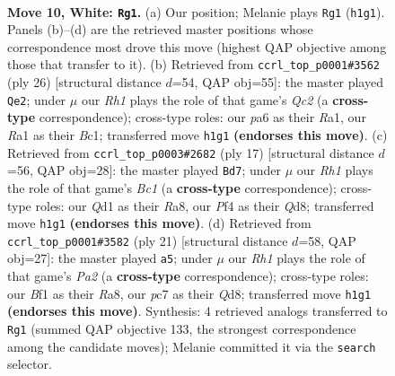 \documentclass[11pt]{article}
\begin{document}
\clearpage

\begin{figure}[p]\centering
\begin{subfigure}{0.46\textwidth}\centering
\resizebox{\linewidth}{!}{%
\newchessgame
\chessboard[
  setfen={rnb1qrk1/1ppn1ppp/p3p3/3pP3/3P1P2/2N4N/PPP2KPP/R2Q1B1R w - - 4 10},
  showmover=false,
  pgfstyle=straightmove, color=movearrow, markmove={h1-g1}
]}
\caption{}
\end{subfigure}\hfill
\begin{subfigure}{0.46\textwidth}\centering
\resizebox{\linewidth}{!}{%
\newchessgame
\chessboard[
  setfen={rn3rk1/1q2bppp/pp1ppn2/8/2PNP3/2N3P1/PPQ2P1P/R1BR2K1 w - - 0 14},
  showmover=false,
  pgfstyle=straightmove, color=movearrow, markmove={c2-e2}
]}
\caption{}
\end{subfigure}
\\[4pt]
\begin{subfigure}{0.46\textwidth}\centering
\resizebox{\linewidth}{!}{%
\newchessgame
\chessboard[
  setfen={r1bq1rk1/pp3ppp/2nppn2/8/1pPP4/P4NP1/1P2PPBP/RN1Q1RK1 b - - 0 9},
  showmover=false,
  pgfstyle=straightmove, color=movearrow, markmove={c8-d7}
]}
\caption{}
\end{subfigure}\hfill
\begin{subfigure}{0.46\textwidth}\centering
\resizebox{\linewidth}{!}{%
\newchessgame
\chessboard[
  setfen={r1bqk2r/pp3ppp/1n2p3/3pP3/1n1P1P2/1P6/P3N1PP/R2QKBNR b KQkq - 0 11},
  showmover=false,
  pgfstyle=straightmove, color=movearrow, markmove={a7-a5}
]}
\caption{}
\end{subfigure}
\caption{\textbf{Move 10, White: \texttt{Rg1}.} (a) Our position; Melanie plays \texttt{Rg1} (\texttt{h1g1}). Panels (b)--(d) are the retrieved master positions whose correspondence most drove this move (highest QAP objective among those that transfer to it). (b) Retrieved from \texttt{ccrl\_top\_p0001\#3562} (ply 26) [structural distance $d$=54, QAP obj=55]: the master played \texttt{Qe2}; under $\mu$ our \emph{Rh1} plays the role of that game's \emph{Qc2} (a \textbf{cross-type} correspondence); cross-type roles: our \emph{p}a6 as their \emph{R}a1, our \emph{R}a1 as their \emph{B}c1; transferred move \texttt{h1g1} \textbf{(endorses this move)}. (c) Retrieved from \texttt{ccrl\_top\_p0003\#2682} (ply 17) [structural distance $d$=56, QAP obj=28]: the master played \texttt{Bd7}; under $\mu$ our \emph{Rh1} plays the role of that game's \emph{Bc1} (a \textbf{cross-type} correspondence); cross-type roles: our \emph{Q}d1 as their \emph{R}a8, our \emph{P}f4 as their \emph{Q}d8; transferred move \texttt{h1g1} \textbf{(endorses this move)}. (d) Retrieved from \texttt{ccrl\_top\_p0001\#3582} (ply 21) [structural distance $d$=58, QAP obj=27]: the master played \texttt{a5}; under $\mu$ our \emph{Rh1} plays the role of that game's \emph{Pa2} (a \textbf{cross-type} correspondence); cross-type roles: our \emph{B}f1 as their \emph{R}a8, our \emph{p}c7 as their \emph{Q}d8; transferred move \texttt{h1g1} \textbf{(endorses this move)}. Synthesis: 4 retrieved analogs transferred to \texttt{Rg1} (summed QAP objective 133, the strongest correspondence among the candidate moves); Melanie committed it via the \texttt{search} selector.}
\label{fig:thought-m18}
\end{figure}
\end{document}
